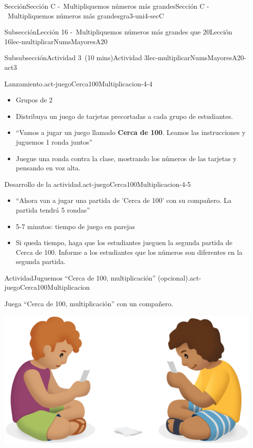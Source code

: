 \documentclass[oneside,10pt,]{article}
\newcommand{\terminology}[1]{\textbf{#1}}
\begin{document}
\begin{sectionptx}{Sección}{Sección C -~Multipliquemos números más grandes}{}{Sección C -~Multipliquemos números más grandes}{}{}{gra3-uni4-secC}
\begin{subsectionptx}{Subsección}{Lección 16 -~Multipliquemos números más grandes que 20}{}{Lección 16}{}{}{lec-multiplicarNumsMayoresA20}
\begin{subsubsectionptx}{Subsubsección}{Actividad 3~(10 mins)}{}{Actividad 3}{}{}{lec-multiplicarNumsMayoresA20-act3}
\begin{paragraphs}{Lanzamiento.}{act-juegoCerca100Multiplicacion-4-4}
%
\begin{itemize}[label=\textbullet]
\item{}Grupos de 2%
\item{}Distribuya un juego de tarjetas precortadas a cada grupo de estudiantes.%
\item{}``Vamos a jugar un juego llamado \terminology{Cerca de 100}. Leamos las instrucciones y juguemos 1 ronda juntos''%
\item{}Juegue una ronda contra la clase, mostrando los números de las tarjetas y pensando en voz alta.%
\end{itemize}
\end{paragraphs}%
\begin{paragraphs}{Desarrollo de la actividad.}{act-juegoCerca100Multiplicacion-4-5}%
%
\begin{itemize}[label=\textbullet]
\item{}``Ahora van a jugar una partida de 'Cerca de 100' con su compañero. La partida tendrá 5 rondas''%
\item{}5-7 minutos: tiempo de juego en parejas%
\item{}Si queda tiempo, haga que los estudiantes jueguen la segunda partida de Cerca de 100. Informe a los estudiantes que los números son diferentes en la segunda partida.%
\end{itemize}
\end{paragraphs}%
\begin{activity}{Actividad}{Juguemos “Cerca de 100, multiplicación” (opcional).}{act-juegoCerca100Multiplicacion}%
\begin{sidebyside}{2}{0.05}{0.05}{0.1}%
\begin{sbspanel}{0.5}%
Juega “Cerca de 100, multiplicación” con un compañero.%
\end{sbspanel}%
\begin{sbspanel}{0.3}%
\includegraphics[width=\linewidth]{external/png-source/CS 3.4 Lesson 16 Activity 2.png}

\end{sbspanel}
\end{sidebyside}
\end{activity}
\end{subsubsectionptx}
\end{subsectionptx}
\end{sectionptx}
\end{document}
